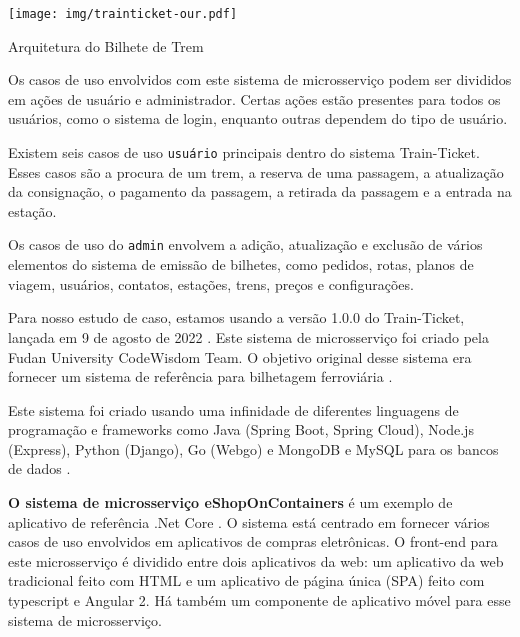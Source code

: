 
\begin{figura}[h]
     \centering
     \hspace{-1.3em}
     \texttt{[image: img/trainticket-our.pdf]}
        \caption{Arquitetura do Bilhete de Trem \cite{bilhete de trem}}
        \label{fig:trem}
\end{figura}

Os casos de uso envolvidos com este sistema de microsserviço podem ser divididos em ações de usuário e administrador. Certas ações estão presentes para todos os usuários, como o sistema de login, enquanto outras dependem do tipo de usuário.

Existem seis casos de uso \texttt{usuário} principais dentro do sistema Train-Ticket. Esses casos são a procura de um trem, a reserva de uma passagem, a atualização da consignação, o pagamento da passagem, a retirada da passagem e a entrada na estação.

Os casos de uso do \texttt{admin} envolvem a adição, atualização e exclusão de vários elementos do sistema de emissão de bilhetes, como pedidos, rotas, planos de viagem, usuários, contatos, estações, trens, preços e configurações.

Para nosso estudo de caso, estamos usando a versão 1.0.0 do Train-Ticket, lançada em 9 de agosto de 2022 \cite{trainticket}. Este sistema de microsserviço foi criado pela Fudan University CodeWisdom Team. O objetivo original desse sistema era fornecer um sistema de referência para bilhetagem ferroviária \cite{zhou2018benchmarking}.

Este sistema foi criado usando uma infinidade de diferentes linguagens de programação e frameworks como Java (Spring Boot, Spring Cloud), Node.js (Express), Python (Django), Go (Webgo) e MongoDB e MySQL para os bancos de dados \cite {Bilhete de trem}.


{\bf O sistema de microsserviço eShopOnContainers} é um exemplo de aplicativo de referência .Net Core \cite{eshop}. O sistema está centrado em fornecer vários casos de uso envolvidos em aplicativos de compras eletrônicas. O front-end para este microsserviço é dividido entre dois aplicativos da web: um aplicativo da web tradicional feito com HTML e um aplicativo de página única (SPA) feito com typescript e Angular 2. Há também um componente de aplicativo móvel para esse sistema de microsserviço.

